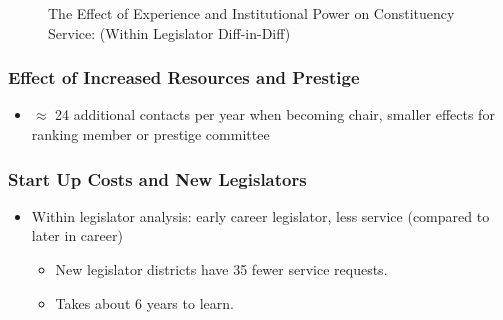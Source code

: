\documentclass[xcolor=dvipsnames]{beamer}
\begin{document}
\begin{frame}

\begin{figure}[hbt!]
\centering
\caption{The Effect of Experience and Institutional Power on Constituency Service: (Within Legislator Diff-in-Diff) } \label{f:m-total-predicted}
\end{figure}
\end{frame}
\begin{frame}
\frametitle{Effect of Increased Resources and Prestige}

\begin{itemize}
	\item $\approx$ 24 additional contacts per year when becoming chair, smaller effects for ranking member or prestige committee 
	\end{itemize}
\end{frame}

\begin{frame}[label= tenure]

\frametitle{Start Up Costs and New Legislators}
\begin{itemize}
\item Within legislator analysis: early career legislator, less service (compared to later in career) \pause 
\begin{itemize}
\item New legislator districts have 35 fewer service requests.
\item Takes about 6 years to learn.
\end{itemize}
 \pause 
\end{itemize}



\hyperlink{district}{}
\end{frame}
\end{document}
